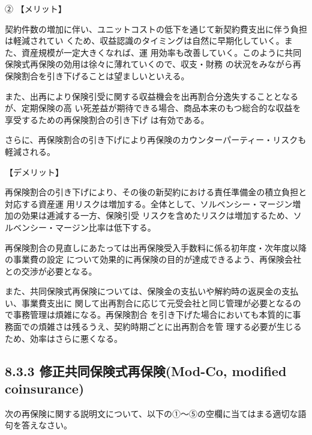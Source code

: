 \documentclass[report,gutter=10mm,fore-edge=10mm,uplatex,dvipdfmx]{jlreq}
\begin{document}
\noindent ②
\noindent 【メリット】

契約件数の増加に伴い、ユニットコストの低下を通じて新契約費支出に伴う負担は軽減されてい
くため、収益認識のタイミングは自然に早期化していく。また、資産規模が一定大きくなれば、運
用効率も改善していく。このように共同保険式再保険の効用は徐々に薄れていくので、収支・財務
の状況をみながら再保険割合を引き下げることは望ましいといえる。

また、出再により保険引受に関する収益機会を出再割合分逸失することとなるが、定期保険の高
い死差益が期待できる場合、商品本来のもつ総合的な収益を享受するための再保険割合の引き下げ
は有効である。

さらに、再保険割合の引き下げにより再保険のカウンターパーティー・リスクも軽減される。

\noindent 【デメリット】

再保険割合の引き下げにより、その後の新契約における責任準備金の積立負担と対応する資産運
用リスクは増加する。全体として、ソルベンシー・マージン増加の効果は逓減する一方、保険引受
リスクを含めたリスクは増加するため、ソルベンシー・マージン比率は低下する。

再保険割合の見直しにあたっては出再保険受入手数料に係る初年度・次年度以降の事業費の設定
について効果的に再保険の目的が達成できるよう、再保険会社との交渉が必要となる。

また、共同保険式再保険については、保険金の支払いや解約時の返戻金の支払い、事業費支出に
関して出再割合に応じて元受会社と同じ管理が必要となるので事務管理は煩雑になる。再保険割合
を引き下げた場合においても本質的に事務面での煩雑さは残るうえ、契約時期ごとに出再割合を管
理する必要が生じるため、効率はさらに悪くなる。

\subsection{8.3.3 修正共同保険式再保険(Mod-Co, modified coinsurance)}
次の再保険に関する説明文について、以下の①～⑤の空欄に当てはまる適切な語句を答えなさい。
\end{document}
